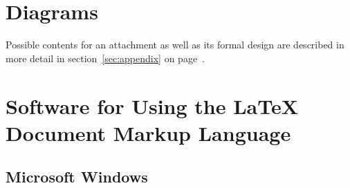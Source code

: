 %
%

\chapter{Diagrams}

Possible contents for an attachment as well as its formal design are described 
in more detail in section~\ref{sec:appendix} on page~\pageref{sec:appendix}.

\chapter{Software for Using the LaTeX Document Markup Language}

\section{Microsoft Windows}



